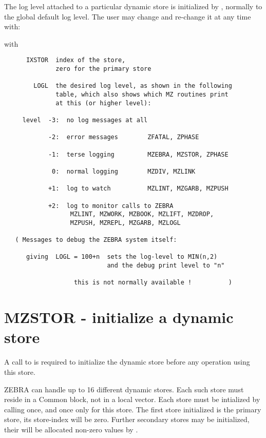 The log level attached to a particular dynamic store is initialized
by , normally to the global default log level.
The user may change and re-change it at any time with:


with
\begin{verbatim}
      IXSTOR  index of the store,
              zero for the primary store

        LOGL  the desired log level, as shown in the following
              table, which also shows which MZ routines print
              at this (or higher level):

     level  -3:  no log messages at all

            -2:  error messages        ZFATAL, ZPHASE

            -1:  terse logging         MZEBRA, MZSTOR, ZPHASE

             0:  normal logging        MZDIV, MZLINK

            +1:  log to watch          MZLINT, MZGARB, MZPUSH

            +2:  log to monitor calls to ZEBRA
                  MZLINT, MZWORK, MZBOOK, MZLIFT, MZDROP,
                  MZPUSH, MZREPL, MZGARB, MZLOGL

   ( Messages to debug the ZEBRA system itself:

      giving  LOGL = 100+n  sets the log-level to MIN(n,2)
                            and the debug print level to "n"

                   this is not normally available !          )
\end{verbatim} 

\section{MZSTOR - initialize a dynamic store}

A call to  is required to initialize the dynamic store before any
operation using this store.

ZEBRA can handle up to 16 different dynamic stores. Each such store
must reside in a Common block, not in a local vector.
Each store must be intialized by calling  once,
and once only for this store.
The first store initialized is the primary store,
its store-index  will be zero.
Further secondary stores may be initialized,
their  will be allocated non-zero values by .

